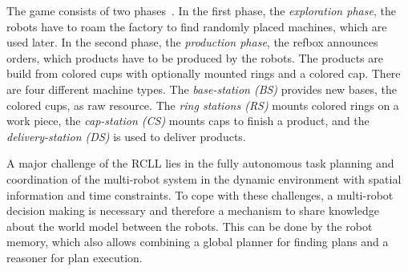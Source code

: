 The game consists of two phases~\cite{LLSF-Rules-2015}. In the first
phase, the \emph{exploration phase}, the robots have to roam the
factory to find randomly placed machines, which are used later.
%
In the second phase, the \emph{production phase}, the refbox announces
orders, which products have to be produced by the robots. The products
are build from colored cups with optionally mounted rings and a
colored cap.
There are four different machine types. The \emph{base-station (BS)}
provides new bases, the colored cups, as raw resource. The \emph{ring
  stations (RS)} mounts colored rings on a work piece,
the \emph{cap-station (CS)} mounts
caps to finish a product, and
the \emph{delivery-station (DS)} is used to deliver products.

A major challenge of the RCLL lies in the fully autonomous task
planning and coordination of the multi-robot system in the dynamic
environment with spatial information and time constraints.
To cope with these challenges, a
multi-robot decision making is necessary and therefore a mechanism to
share knowledge about the world model between the robots. This can be
done by the robot memory, which also allows combining a global planner
for finding plans and a reasoner for plan execution.


